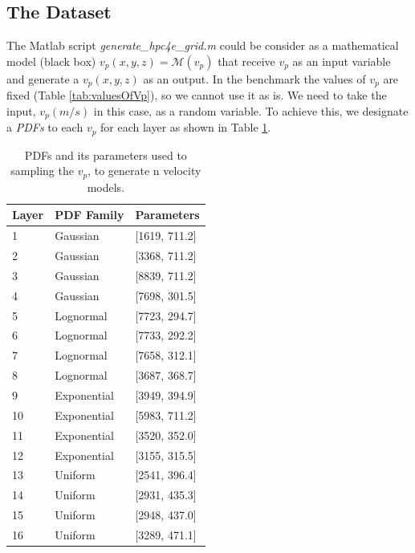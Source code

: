\subsection{The Dataset}
The Matlab script \textit{generate\_hpc4e\_grid.m} could be consider as a mathematical model (black box) $v_{p}(x,y,z) = \mathcal{M}(v_{p})$ that receive $v_{p}$ as an input variable and generate a $v_{p}(x,y,z)$ as an output. In the benchmark the values of $v_{p}$ are fixed (Table \ref{tab:valuesOfVp}), so we cannot use it as is. We need to take the input, $v_{p}(m/s)$  in this case, as a random variable. To achieve this, we designate a \textit{PDFs} to each $v_{p}$ for each layer as shown in Table \ref{tab:PDFsOfVp}.

\begin{table}[H]
\begin{center}
    \begin{tabular}{|l|l|l|}
    \hline
    \textbf{Layer} & \textbf{PDF Family}                & \textbf{Parameters}           \\ \hline
    1     & Gaussian & [1619, 711.2] \\ \hline
    2     & Gaussian & [3368, 711.2]               \\ \hline
    3     & Gaussian & [8839, 711.2]               \\ \hline
    4     & Gaussian & [7698, 301.5]               \\ \hline
    5     & Lognormal   & [7723, 294.7]               \\ \hline
    6     & Lognormal   & [7733, 292.2]               \\ \hline
    7     & Lognormal   & [7658, 312.1]               \\ \hline
    8     & Lognormal   & [3687, 368.7]               \\ \hline
    9     & Exponential & [3949, 394.9]             \\ \hline
    10   & Exponential & [5983, 711.2]               \\ \hline
    11   & Exponential & [3520, 352.0]              \\ \hline
    12   & Exponential & [3155, 315.5]              \\ \hline
    13   & Uniform     & [2541, 396.4]              \\ \hline
    14   & Uniform     & [2931, 435.3]              \\ \hline
    15   & Uniform     & [2948, 437.0]             \\ \hline
    16   & Uniform     & [3289, 471.1]              \\ \hline
    \end{tabular}
    \caption {PDFs and its parameters used to sampling the $v_{p}$, to generate n velocity models.}
    \label{tab:PDFsOfVp}
    \end{center}
\end{table}

